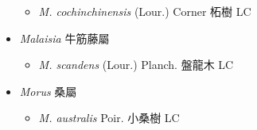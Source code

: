 \begin{itemize}
  \begin{itemize}
        \item[] \textit{M. cochinchinensis} (Lour.) Corner  柘樹   LC
  \end{itemize}
 \item[] \textit{Malaisia} 牛筋藤屬
                                
  \begin{itemize}
        \item[] \textit{M. scandens} (Lour.) Planch.  盤龍木   LC
  \end{itemize}
 \item[] \textit{Morus} 桑屬
                                
  \begin{itemize}
        \item[] \textit{M. australis} Poir.  小桑樹   LC
  \end{itemize}
  \end{itemize}
